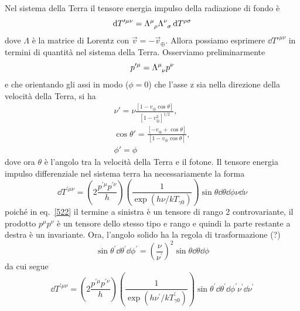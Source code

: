 Nel sistema della Terra il tensore energia impulso della radiazione di fondo è
\begin{equation}
  \dd T'^{\mu \nu} = \tensor{\Lambda}{^{\mu}_{\rho}} \tensor{\Lambda}{^{\nu}_{\sigma}}
  \dd T^{\rho\sigma}
\end{equation}
dove $\Lambda$ è la matrice di Lorentz con $\vec{v} = - \vec{v}_{\oplus}$.
Allora possiamo esprimere $\dd T'^{\mu \nu}$ in termini di quantità nel sistema
della Terra.  Osserviamo preliminarmente
\begin{equation}
  p'^{\mu } = \tensor{\Lambda}{^{\mu}_{\nu}} p^{\nu}
\end{equation}
e che orientando gli assi in modo ($\phi=0$) che l'asse z sia nella direzione della
velocità della Terra,  si ha
\begin{subequations}
  \begin{gather}
    \nu' = \nu \frac{[1-v_{\oplus}\cos\theta]}{[ 1 - v_{\oplus}^2]^{1/2}}, \\
    \cos\theta' = \frac{[- v_{\oplus} + \cos\theta]}{[1 - v_{\oplus}
      \cos\theta]}, \\
    \phi' = \phi
  \end{gather}
\end{subequations}
dove ora $\theta$ è l'angolo tra la velocità della Terra e il fotone.
Il tensore energia impulso differenziale nel sistema terra ha necessariamente la forma
\begin{equation}
  \dd T^{\prime \mu \nu}= \left( 2 \frac{ p^{\prime \mu} p^{\prime \nu} }{h} \right)
                   \left( \frac{1} { \exp (h \nu/ kT_{\gamma 0 }) } \right)
  \sin \theta \dd\theta \dd\phi \nu \dd\nu
\end{equation}
poiché in eq.~\eqref{522} il termine a sinistra è un tensore di rango 2
controvariante, il prodotto $p^{\mu} p^{\nu}$ è un tensore dello stesso tipo e
rango e quindi la parte restante a destra è un invariante.  Ora, l'angolo solido
ha la regola di trasformazione (?)
\begin{equation}
 \sin \theta^{\prime} \dd\theta^{\prime} \dd\phi^{\prime}
= \left( \frac {\nu}{\nu^{\prime}} \right)^2 \sin \theta \dd\theta \dd\phi
\end{equation}
da cui segue
\begin{equation}
  \dd T^{\prime \mu \nu}= \left( 2 \frac{ p^{\prime \mu} p^{\prime \nu} }{h} \right)
                   \left( \frac{1} { \exp (h \nu^{\prime}/ kT^{\prime}_{\gamma 0 }) } \right)
  \sin \theta^{\prime} \dd\theta^{\prime} \dd\phi^{\prime} \nu^{\prime} \dd\nu^{\prime}
\end{equation}
